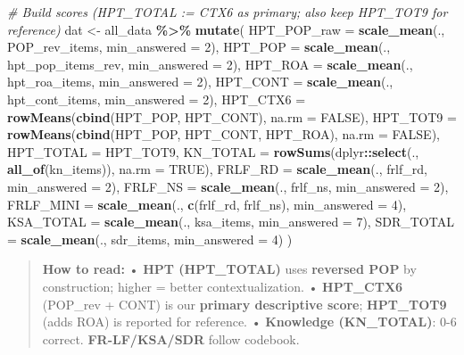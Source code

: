 \documentclass[
  10pt,
]{article}
\newenvironment{Shaded}{\begin{snugshade}}{\end{snugshade}}
\newcommand{\AttributeTok}[1]{\textcolor[rgb]{0.13,0.29,0.53}{#1}}
\newcommand{\CommentTok}[1]{\textcolor[rgb]{0.56,0.35,0.01}{\textit{#1}}}
\newcommand{\ConstantTok}[1]{\textcolor[rgb]{0.56,0.35,0.01}{#1}}
\newcommand{\DecValTok}[1]{\textcolor[rgb]{0.00,0.00,0.81}{#1}}
\newcommand{\FunctionTok}[1]{\textcolor[rgb]{0.13,0.29,0.53}{\textbf{#1}}}
\newcommand{\NormalTok}[1]{#1}
\newcommand{\OtherTok}[1]{\textcolor[rgb]{0.56,0.35,0.01}{#1}}
\newcommand{\SpecialCharTok}[1]{\textcolor[rgb]{0.81,0.36,0.00}{\textbf{#1}}}
\begin{document}
\begin{Shaded}
\begin{Highlighting}[]
\CommentTok{\# Build scores (HPT\_TOTAL := CTX6 as primary; also keep HPT\_TOT9 for reference)}
\NormalTok{dat }\OtherTok{\textless{}{-}}\NormalTok{ all\_data }\SpecialCharTok{\%\textgreater{}\%}
  \FunctionTok{mutate}\NormalTok{(}
    \AttributeTok{HPT\_POP\_raw =} \FunctionTok{scale\_mean}\NormalTok{(., POP\_rev\_items, }\AttributeTok{min\_answered =} \DecValTok{2}\NormalTok{),}
    \AttributeTok{HPT\_POP    =} \FunctionTok{scale\_mean}\NormalTok{(., hpt\_pop\_items\_rev, }\AttributeTok{min\_answered =} \DecValTok{2}\NormalTok{),}
    \AttributeTok{HPT\_ROA    =} \FunctionTok{scale\_mean}\NormalTok{(., hpt\_roa\_items, }\AttributeTok{min\_answered =} \DecValTok{2}\NormalTok{),}
    \AttributeTok{HPT\_CONT   =} \FunctionTok{scale\_mean}\NormalTok{(., hpt\_cont\_items, }\AttributeTok{min\_answered =} \DecValTok{2}\NormalTok{),}
    \AttributeTok{HPT\_CTX6   =} \FunctionTok{rowMeans}\NormalTok{(}\FunctionTok{cbind}\NormalTok{(HPT\_POP, HPT\_CONT), }\AttributeTok{na.rm =} \ConstantTok{FALSE}\NormalTok{),}
    \AttributeTok{HPT\_TOT9   =} \FunctionTok{rowMeans}\NormalTok{(}\FunctionTok{cbind}\NormalTok{(HPT\_POP, HPT\_CONT, HPT\_ROA),}
                          \AttributeTok{na.rm =} \ConstantTok{FALSE}\NormalTok{),}
    \AttributeTok{HPT\_TOTAL  =}\NormalTok{ HPT\_TOT9,}
    \AttributeTok{KN\_TOTAL   =} \FunctionTok{rowSums}\NormalTok{(dplyr}\SpecialCharTok{::}\FunctionTok{select}\NormalTok{(., }\FunctionTok{all\_of}\NormalTok{(kn\_items)), }\AttributeTok{na.rm =} \ConstantTok{TRUE}\NormalTok{),}
    \AttributeTok{FRLF\_RD    =} \FunctionTok{scale\_mean}\NormalTok{(., frlf\_rd, }\AttributeTok{min\_answered =} \DecValTok{2}\NormalTok{),}
    \AttributeTok{FRLF\_NS    =} \FunctionTok{scale\_mean}\NormalTok{(., frlf\_ns, }\AttributeTok{min\_answered =} \DecValTok{2}\NormalTok{),}
    \AttributeTok{FRLF\_MINI  =} \FunctionTok{scale\_mean}\NormalTok{(., }\FunctionTok{c}\NormalTok{(frlf\_rd, frlf\_ns), }\AttributeTok{min\_answered =} \DecValTok{4}\NormalTok{),}
    \AttributeTok{KSA\_TOTAL  =} \FunctionTok{scale\_mean}\NormalTok{(., ksa\_items, }\AttributeTok{min\_answered =} \DecValTok{7}\NormalTok{),}
    \AttributeTok{SDR\_TOTAL  =} \FunctionTok{scale\_mean}\NormalTok{(., sdr\_items, }\AttributeTok{min\_answered =} \DecValTok{4}\NormalTok{)}
\NormalTok{  )}
\end{Highlighting}
\end{Shaded}

\begin{quote}
\textbf{How to read:} • \textbf{HPT (HPT\_TOTAL)} uses \textbf{reversed
POP} by construction; higher = better contextualization. •
\textbf{HPT\_CTX6} (POP\_rev + CONT) is our \textbf{primary descriptive
score}; \textbf{HPT\_TOT9} (adds ROA) is reported for reference. •
\textbf{Knowledge (KN\_TOTAL)}: 0-6 correct. \textbf{FR-LF/KSA/SDR}
follow codebook.
\end{quote}
\end{document}

